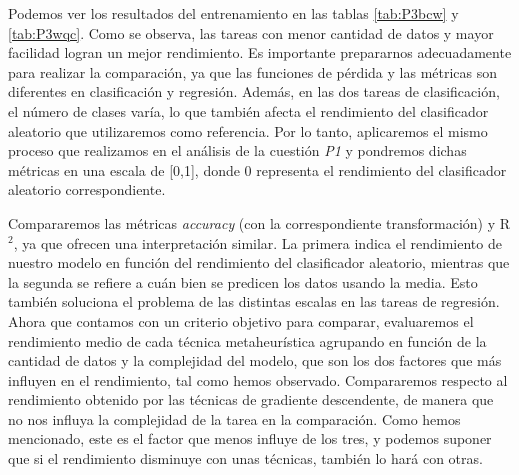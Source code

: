 Podemos ver los resultados del entrenamiento en las tablas \ref{tab:P3bcw} y \ref{tab:P3wqc}. Como se observa, las tareas con menor cantidad de datos y mayor facilidad logran un mejor rendimiento. Es importante prepararnos adecuadamente para realizar la comparación, ya que las funciones de pérdida y las métricas son diferentes en clasificación y regresión. Además, en las dos tareas de clasificación, el número de clases varía, lo que también afecta el rendimiento del clasificador aleatorio que utilizaremos como referencia. Por lo tanto, aplicaremos el mismo proceso que realizamos en el análisis de la cuestión \textit{P1} y pondremos dichas métricas en una escala de [0,1], donde 0 representa el rendimiento del clasificador aleatorio correspondiente.



Compararemos las métricas \textit{accuracy} (con la correspondiente transformación) y R$^2$, ya que ofrecen una interpretación similar. La primera indica el rendimiento de nuestro modelo en función del rendimiento del clasificador aleatorio, mientras que la segunda se refiere a cuán bien se predicen los datos usando la media. Esto también soluciona el problema de las distintas escalas en las tareas de regresión. Ahora que contamos con un criterio objetivo para comparar, evaluaremos el rendimiento medio de cada técnica metaheurística agrupando en función de la cantidad de datos y la complejidad del modelo, que son los dos factores que más influyen en el rendimiento, tal como hemos observado. Compararemos respecto al rendimiento obtenido por las técnicas de gradiente descendente, de manera que no nos influya la complejidad de la tarea en la comparación. Como hemos mencionado, este es el factor que menos influye de los tres, y podemos suponer que si el rendimiento disminuye con unas técnicas, también lo hará con otras.

